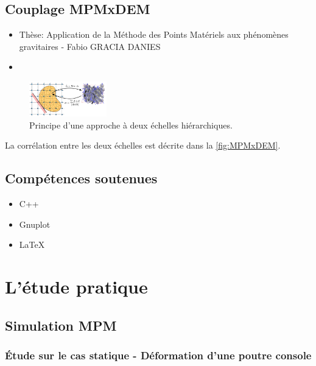 \documentclass[a4paper,12pt]{report}
\begin{document}
\section{Couplage MPMxDEM}
\begin{itemize}
      \item Thèse: Application de la Méthode des Points Matériels aux phénomènes gravitaires - Fabio GRACIA DANIES
      \item \cite{richefeu2025mpmxdem}
\end{itemize}
\begin{figure}
\centering
\includegraphics[width=0.3\textwidth]{CouplageMPMxDEM.png}
\caption{Principe d’une approche à deux échelles hiérarchiques.\cite{projetderecherche}}
\label{fig:MPMxDEM}
\end{figure}
La corrélation entre les deux échelles est décrite dans la \autoref{fig:MPMxDEM}. 

\section{Compétences soutenues}
\begin{itemize}
      \item C++
      \item Gnuplot
      \item LaTeX
\end{itemize}


\chapter{L'étude pratique}
\section{Simulation MPM}
\subsection{Étude sur le cas statique - Déformation d'une poutre console}
\end{document}
